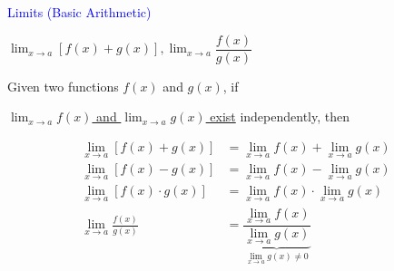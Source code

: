 \documentclass[14pt,fleqn]{extarticle}
\begin{document}
\begin{skill}
\textcolor{blue}{Limits (Basic Arithmetic)} 

\small$\lim_{x\to a}\left[ f(x) + g(x) \right], \lim_{x\to a}\dfrac{f(x)}{g(x)}$
\end{skill}

\newcard 

Given two functions $f(x)$ and $g(x)$, if

\underline{$\lim_{x\to a}f(x)$ and $\lim_{x\to a}g(x)$ exist}
independently, then 

%
\begin{align}
\lim_{x\to a}\left[ f(x) + g(x)\right] &= \lim_{x\to a}f(x) + \lim_{x\to a}g(x)  \\
\lim_{x\to a}\left[ f(x) - g(x)\right] &= \lim_{x\to a}f(x) - \lim_{x\to a}g(x) \\
\lim_{x\to a}\left[ f(x)\cdot g(x)\right] &= \lim_{x\to a}f(x)\cdot\lim_{x\to a}g(x)  \\
\lim_{x\to a}\frac{f(x)}{g(x)} &= \underbrace{\dfrac{\lim_{x\to a}f(x)}{\lim_{x\to a}g(x)}}_{ \lim_{x\to a}g(x) \neq 0}
\end{align}  
\end{document}
